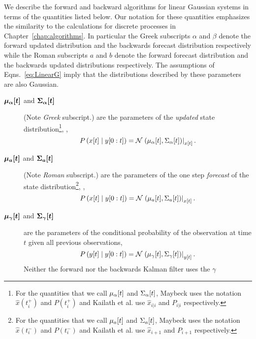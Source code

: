 We describe the forward and backward algorithms for linear Gaussian
systems in terms of the quantities listed below.  Our notation for
these quantities emphasizes the similarity to the calculations for
discrete processes in Chapter~\ref{chap:algorithms}.  In particular
the Greek subscripts $\alpha$ and $\beta$ denote the forward updated
distribution and the backwards forecast distribution respectively while
the Roman subscripts $a$ and $b$ denote the forward forecast
distribution and the backwards updated distributions respectively.
The assumptions of Eqns.~\eqref{eq:LinearG} imply that the
distributions described by these parameters are also Gaussian.
\begin{description}
\item[$\bm{{\mu_\alpha}{[t]}}$ and $\bm{{\Sigma_\alpha}{[t]}}$]
  (Note \emph{Greek} subscript.) are the parameters of the
  \emph{updated} state distribution\footnote{For the quantities that
    we call ${\mu_\alpha}{[t]}$ and ${\Sigma_\alpha}{[t]}$,
    Maybeck\cite{Maybeck82} uses the notation $\hat x(t^+_i)$ and
    $P(t^+_i)$ and Kailath et al.\cite{KSH00} use $\hat x_{i|i}$ and
    $P_{i|i}$ respectively.}, \ie,
  \begin{equation*}
    P\left({x}{[t]}\mid y[0:t] \right) =
    {\mathcal{N}}\left.\left({\mu_\alpha}{[t]},{\Sigma_\alpha}{[t]}\right)\right|_{{x}{[t]}}.
  \end{equation*}
\item[$\bm{{\mu_a}{[t]}}$ and $\bm{{\Sigma_a}{[t]}}$] (Note
  \emph{Roman} subscript.) are the parameters of the one step
  \emph{forecast} of the state distribution\footnote{For the
    quantities that we call ${\mu_a}{[t]}$ and ${\Sigma_a}{[t]}$,
    Maybeck\cite{Maybeck82} uses the notation $\hat x(t^-_i)$ and
    $P(t^-_i)$ and Kailath et al.\cite{KSH00} use $\hat x_{i+1}$ and
    $P_{i+1}$ respectively.}, \ie,
  \begin{equation*}
    P \left({x}{[t]}\mid y[0:t] \right) =
    {\mathcal{N}}\left.\left({\mu_a}{[t]},{\Sigma_a}{[t]}\right)\right|_{{x}{[t]}}.
  \end{equation*}
\item[$\bm{{\mu_\gamma}{[t]}}$ and $\bm{{\Sigma_\gamma}{[t]}}$] are
  the parameters of the conditional probability of the observation at
  time $t$ given all previous observations, \ie
  \begin{equation*}
    P\left({y}{[t]}\mid y[0:t] \right) =
    {\mathcal{N}}\left.\left({\mu_\gamma}{[t]},{\Sigma_\gamma}{[t]}\right)\right|_{{y}{[t]}}.
  \end{equation*}
  Neither the forward nor the backwards Kalman filter uses the $\gamma$

\end{description}
